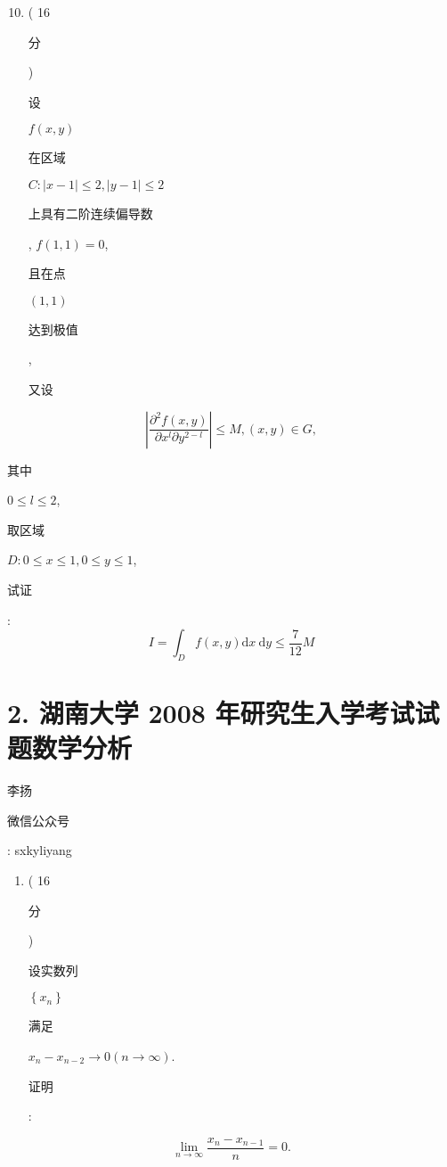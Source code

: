 \documentclass[10pt]{article}
\begin{document}
\begin{enumerate}
  \setcounter{enumi}{9}
  \item ( 16 \begin{CJK}{UTF8}{mj}分\end{CJK}) \begin{CJK}{UTF8}{mj}设\end{CJK} $f(x, y)$ \begin{CJK}{UTF8}{mj}在区域\end{CJK} $C:|x-1| \leqslant 2,|y-1| \leqslant 2$ \begin{CJK}{UTF8}{mj}上具有二阶连续偏导数\end{CJK}, $f(1,1)=0$, \begin{CJK}{UTF8}{mj}且在点\end{CJK} $(1,1)$ \begin{CJK}{UTF8}{mj}达到极值\end{CJK}, \begin{CJK}{UTF8}{mj}又设\end{CJK}
\end{enumerate}
$$
\left|\frac{\partial^{2} f(x, y)}{\partial x^{l} \partial y^{2-l}}\right| \leqslant M,(x, y) \in G,
$$
\begin{CJK}{UTF8}{mj}其中\end{CJK} $0 \leqslant l \leqslant 2$, \begin{CJK}{UTF8}{mj}取区域\end{CJK} $D: 0 \leqslant x \leqslant 1,0 \leqslant y \leqslant 1$, \begin{CJK}{UTF8}{mj}试证\end{CJK}:
$$
I=\int_{D} f(x, y) \mathrm{d} x \mathrm{~d} y \leqslant \frac{7}{12} M
$$

\section{2. 湖南大学 2008 年研究生入学考试试题数学分析}
\begin{CJK}{UTF8}{mj}李扬\end{CJK}

\begin{CJK}{UTF8}{mj}微信公众号\end{CJK}: sxkyliyang

\begin{enumerate}
  \item ( 16 \begin{CJK}{UTF8}{mj}分\end{CJK}) \begin{CJK}{UTF8}{mj}设实数列\end{CJK} $\left\{x_{n}\right\}$ \begin{CJK}{UTF8}{mj}满足\end{CJK} $x_{n}-x_{n-2} \rightarrow 0(n \rightarrow \infty)$. \begin{CJK}{UTF8}{mj}证明\end{CJK}:
\end{enumerate}
$$
\lim _{n \rightarrow \infty} \frac{x_{n}-x_{n-1}}{n}=0 .
$$
\end{document}
